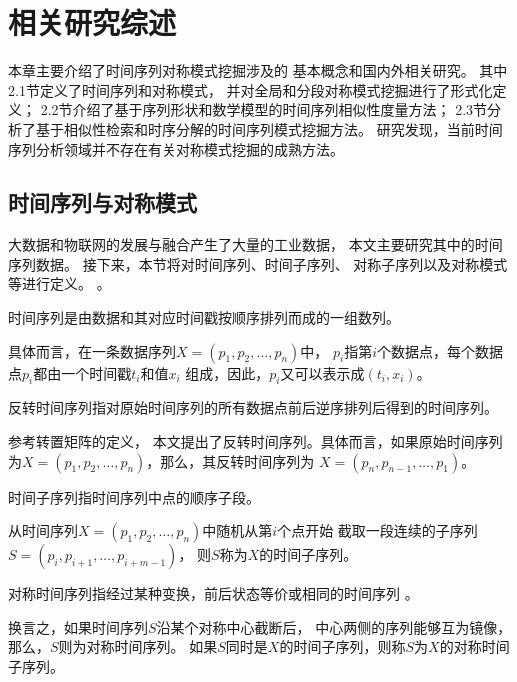 
\chapter{相关研究综述}
本章主要介绍了时间序列对称模式挖掘涉及的
基本概念和国内外相关研究。
其中2.1节定义了时间序列和对称模式，
并对全局和分段对称模式挖掘进行了形式化定义；
2.2节介绍了基于序列形状和数学模型的时间序列相似性度量方法；
2.3节分析了基于相似性检索和时序分解的时间序列模式挖掘方法。
研究发现，当前时间序列分析领域并不存在有关对称模式挖掘的成熟方法。

\section{时间序列与对称模式}
大数据和物联网的发展与融合产生了大量的工业数据，
本文主要研究其中的时间序列数据。
接下来，本节将对时间序列、时间子序列、
对称子序列以及对称模式等进行定义。
\cite{DBLP:journals/ijsi/GaoSW21}。

\begin{definition}
  时间序列是由数据和其对应时间戳按顺序排列而成的一组数列\cite{DBLP:journals/csur/EslingA12}。

  具体而言，在一条数据序列$X = \left( p_1,p_2,\dots,p_n \right)$中，
  $p_i$指第$i$个数据点，每个数据点$p_i$都由一个时间戳$t_i$和值$x_i$
  组成，因此，$p_i$又可以表示成$\left( t_i,x_i \right)$。
\end{definition}

\begin{definition}
  反转时间序列指对原始时间序列的所有数据点前后逆序排列后得到的时间序列。

  参考转置矩阵的定义\cite{DBLP:conf/vecpar/HishinumaHT16}，
  本文提出了反转时间序列。具体而言，如果原始时间序列
  为$X = \left( p_1,p_2,\dots,p_n \right)$，那么，其反转时间序列为
  $X = \left( p_n,p_{n-1},\dots,p_1 \right)$。
\end{definition}

\begin{definition}
  时间子序列指时间序列中点的顺序子段。

  从时间序列$X=\left( p_1,p_2,\dots,p_n \right)$中随机从第$i$个点开始
  截取一段连续的子序列$S = \left( p_i,p_{i+1},\dots,p_{i+m-1} \right)$，
  则$S$称为$X$的时间子序列。 
\end{definition}

\begin{definition}
  对称时间序列指经过某种变换，前后状态等价或相同的时间序列
  \cite{DBLP:journals/pami/NackmanP85}。

  换言之，如果时间序列$S$沿某个对称中心截断后，
  中心两侧的序列能够互为镜像，那么，$S$则为对称时间序列。
  如果$S$同时是$X$的时间子序列，则称$S$为$X$的对称时间子序列。
\end{definition}

